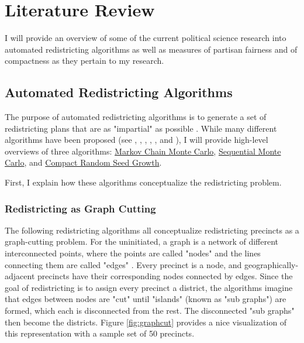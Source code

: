 \section{Literature Review}

I will provide an overview of some of the current political science research into automated redistricting algorithms as well as measures of partisan fairness and of compactness as they pertain to my research. 

\subsection{Automated Redistricting Algorithms}

The purpose of automated redistricting algorithms is to generate a set of redistricting plans that are as "impartial" as possible \parencite{chen2013}. While many different algorithms have been proposed (see \textcite{altman2009}, \textcite{haas2020}, \textcite{lara-caballero2019}, \textcite{macmillan2001}, \textcite{weaver1963}, and \textcite{xiao2008}), I will provide high-level overviews of three algorithms: \hyperref[sec:mcmc]{Markov Chain Monte Carlo}, \hyperref[sec:smc]{Sequential Monte Carlo}, and \hyperref[sec:crsg]{Compact Random Seed Growth}. 

First, I explain how these algorithms conceptualize the redistricting problem. 

\subsubsection{Redistricting as Graph Cutting}

The following redistricting algorithms all conceptualize redistricting precincts as a graph-cutting problem. For the uninitiated, a graph is a network of different interconnected points, where the points are called "nodes" and the lines connecting them are called "edges" \parencite{fifield2020}. Every precinct is a node, and geographically-adjacent precincts have their corresponding nodes connected by edges. Since the goal of redistricting is to assign every precinct a district, the algorithms imagine that edges between nodes are "cut" until "islands" (known as "sub graphs") are formed, which each is disconnected from the rest. The disconnected "sub graphs" then become the districts. Figure \ref{fig:graphcut} provides a nice visualization of this representation with a sample set of 50 precincts\parencite{fifield2020}. 

